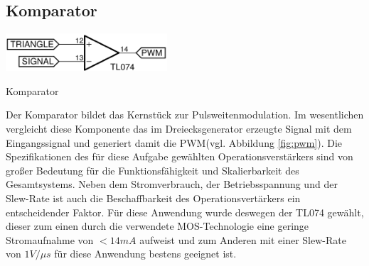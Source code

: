 \newpage
\subsection{Komparator}
\begin{floatingfigure}[r]{6.5cm}
\includegraphics[width=6cm]{gfx/comp.pdf}
\caption{Komparator}
\label{fig:comp}
\end{floatingfigure}
\noindent
Der Komparator bildet das Kernstück zur Pulsweitenmodulation. Im wesentlichen vergleicht diese Komponente das im Dreiecksgenerator erzeugte Signal mit dem Eingangssignal und generiert damit die PWM(vgl. Abbildung \ref{fig:pwm}). Die Spezifikationen des für diese Aufgabe gewählten Operationsverstärkers sind von großer Bedeutung für die Funktionsfähigkeit und Skalierbarkeit des Gesamtsystems. Neben dem Stromverbrauch, der Betriebsspannung und der Slew-Rate ist auch die Beschaffbarkeit des Operationsvertärkers ein entscheidender Faktor. Für diese Anwendung wurde deswegen der TL074 gewählt, dieser zum einen durch die verwendete MOS-Technologie eine geringe Stromaufnahme von $< 14mA$ aufweist und zum Anderen mit einer Slew-Rate von $1V/ \mu s$ für diese Anwendung bestens geeignet ist.
\\
